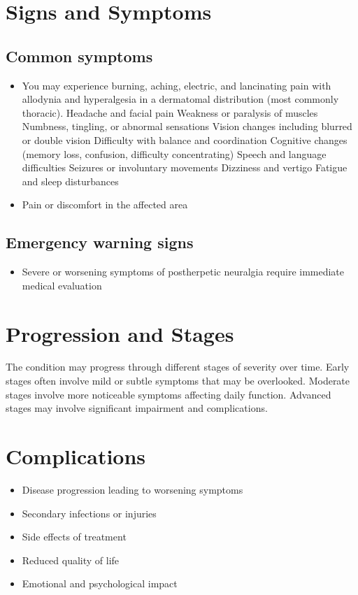 \section{Signs and Symptoms}
\subsection{Common symptoms}
\begin{itemize}[noitemsep]
  \item You may experience burning, aching, electric, and lancinating pain with allodynia and hyperalgesia in a dermatomal distribution (most commonly thoracic). Headache and facial pain Weakness or paralysis of muscles Numbness, tingling, or abnormal sensations Vision changes including blurred or double vision Difficulty with balance and coordination Cognitive changes (memory loss, confusion, difficulty concentrating) Speech and language difficulties Seizures or involuntary movements Dizziness and vertigo Fatigue and sleep disturbances
  \item Pain or discomfort in the affected area
  \end{itemize}
\subsection{Emergency warning signs}
\begin{itemize}[noitemsep]
  \item Severe or worsening symptoms of postherpetic neuralgia require immediate medical evaluation
\end{itemize}
\section{Progression and Stages}
The condition may progress through different stages of severity over time. Early stages often involve mild or subtle symptoms that may be overlooked. Moderate stages involve more noticeable symptoms affecting daily function. Advanced stages may involve significant impairment and complications.
\section{Complications}
\begin{itemize}[noitemsep]
  \item Disease progression leading to worsening symptoms
  \item Secondary infections or injuries
  \item Side effects of treatment
  \item Reduced quality of life
  \item Emotional and psychological impact
\end{itemize}
